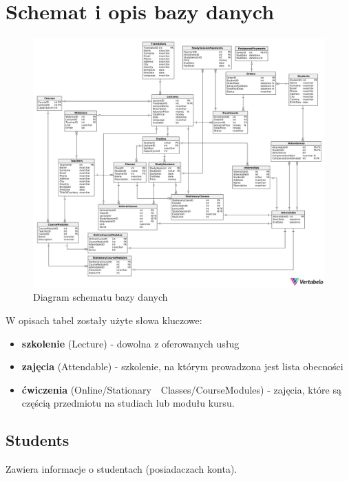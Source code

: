 \documentclass[11pt,a4paper]{article}
\begin{document}
\section{Schemat i opis bazy danych}

\begin{figure}[H]
    \centering
    \includegraphics[scale=0.45, center]{scheme.png}
    \caption{Diagram schematu bazy danych}
    \label{fig:enter-label}
\end{figure}

\noindent W opisach tabel zostały użyte słowa kluczowe:
\begin{itemize}
    \item \textbf{szkolenie} (Lecture) - dowolna z oferowanych usług
    \item \textbf{zajęcia} (Attendable) - szkolenie, na którym prowadzona jest lista obecności
    \item \textbf{ćwiczenia} (Online/Stationary\ \ Classes/CourseModules) - zajęcia, które są częścią przedmiotu na studiach lub modułu kursu.
\end{itemize}

\newpage

\subsection{Students}
Zawiera informacje o studentach (posiadaczach konta).
\end{document}
